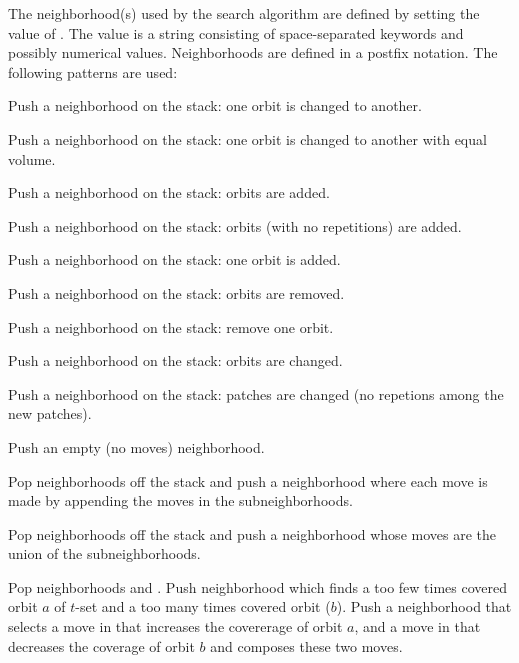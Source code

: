 \documentclass[12pt,a4paper]{article}
\begin{document}
The neighborhood(s) used by the search algorithm are defined by
setting the value of . The value is a string consisting of
space-separated keywords and possibly numerical values. Neighborhoods
are defined in a postfix notation. The following patterns are used:

\begin{owndescription}
\item[\Var{changeone}] Push a neighborhood on the stack: one orbit is
  changed to another.
\item[\Var{vchangeone}] Push a neighborhood on the stack: one orbit is
  changed to another with equal volume.
\item[\Val{ncount} \Var{addmany}] Push a neighborhood on the
  stack:  orbits are added.
\item[\Val{ncount} \Var{addmanyunique}] Push a neighborhood on the
  stack:  orbits (with no repetitions) are added.
\item[\Var{addone}] Push a neighborhood on the stack: one orbit is added.
\item[\Val{ncount} \Var{removemany}] Push a neighborhood on the
  stack:  orbits are removed.
\item[\Var{removeone}] Push a neighborhood on the stack: remove one orbit.
\item[\Val{ncount} \Var{changemany}] Push a neighborhood on the
  stack:  orbits are changed.
\item[\Val{ncount} \Var{changemanyunique}] Push a neighborhood on
  the stack:  patches are changed (no repetions among the
  new patches).
\item[\Var{empty}] Push an empty (no moves) neighborhood.
\item[\Val{n} \Var{composite}] Pop  neighborhoods off the stack
  and push a neighborhood where each move is made by appending the moves
  in the  subneighborhoods.
\item[\Val{n} \Var{union}] Pop  neighborhoods off the stack and
  push a neighborhood whose moves are the union of the 
  subneighborhoods.
\item[\Var{balance}] Pop neighborhoods  and . Push
  neighborhood which finds a too few times covered orbit $a$ of
  $t$-set and a too many times covered orbit ($b$). Push a
  neighborhood that selects a move in  that increases the
  covererage of orbit $a$, and a move in  that decreases the
  coverage of orbit $b$ and composes these two moves.

\end{owndescription}
\end{document}
